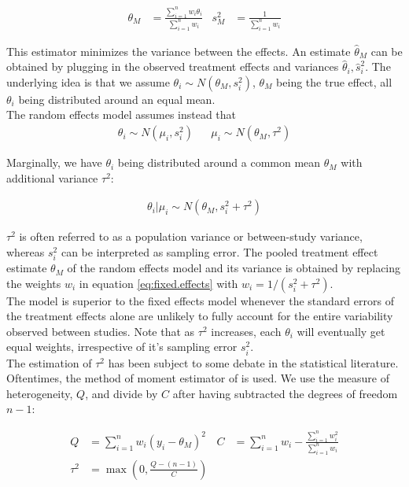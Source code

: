 \begin{align}
\theta_M &= \frac{\sum_{i = 1}^n w_i \theta_i}{\sum_{i = 1}^n w_i} &
s_M^2 &= \frac{1}{\sum_{i = 1}^n w_i} \label{eq:fixed.effects}
\end{align}

This estimator minimizes the variance between the effects. An estimate $\hat{\theta}_M$ can be obtained by plugging in the observed treatment effects and variances $\hat{\theta}_i, \hat{s}_i^2$. The underlying idea is that we assume $\theta_i \sim N(\theta_M, s_i^2)$, $\theta_M$ being the true effect, all $\theta_i$ being distributed around an equal mean. \\
The random effects model \citep{whitehead} assumes instead that 
\begin{align}
\theta_i \sim N(\mu_i, s_i^2) &&
\mu_i \sim N(\theta_M, \tau^2) \label{eq:random.effects} 
\end{align}

Marginally, we have $\theta_i$ being distributed around a common mean $\theta_M$ with additional variance $\tau^2$:

\begin{align}
\theta_i | \mu_i \sim N(\theta_M, s_i^2 + \tau^2) \nonumber %
\end{align}

$\tau^2$ is often referred to as a population variance or between-study variance, whereas $s_i^2$ can be interpreted as sampling error. The pooled treatment effect estimate $\theta_M$ of the random effects model and its variance is obtained by replacing the weights $w_i$ in equation \ref{eq:fixed.effects} with $w_i = 1/(s_i^2 + \tau^2)$. \\
The model is superior to the fixed effects model whenever the standard errors of the treatment effects alone are unlikely to fully account for the entire variability observed between studies. Note that as $\tau^2$ increases, each $\theta_i$ will eventually get equal weights, irrespective of it's sampling error $s_i^2$.\\
The estimation of $\tau^2$ has been subject to some debate in the statistical literature. Oftentimes, the method of moment estimator of \citet{tau.estimator} is used.
We use the measure of heterogeneity, $Q$, and divide by $C$ after having subtracted the degrees of freedom $n-1$:

\begin{align}
Q &= \sum_{i = 1}^n w_i(y_i - \theta_M)^2 & C &= \sum_{i = 1}^n w_i - \frac{\sum_{i = 1}^n w_i^2}{\sum_{i = 1}^n w_i}\label{eq:Q.heterogeneity} \\
\tau^2 &= \max(0, \frac{Q - (n-1)}{C}) \label{eq:Tau.definition}
\end{align}

